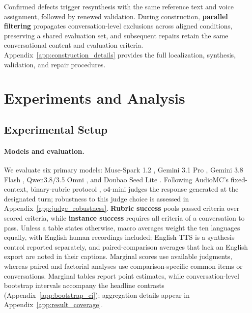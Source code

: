 \documentclass{article}
\begin{document}
    Confirmed defects trigger resynthesis with the same reference text and voice assignment, followed by renewed validation. During construction, \textbf{parallel filtering} propagates conversation-level exclusions across aligned conditions, preserving a shared evaluation set, and subsequent repairs retain the same conversational content and evaluation criteria. Appendix~\ref{app:construction_details} provides the full localization, synthesis, validation, and repair procedures.

\section{Experiments and Analysis}
\label{sec:experiments}

\subsection{Experimental Setup}
\label{sec:experimental_setup}

\paragraph{Models and evaluation.}
We evaluate six primary models: Muse-Spark 1.2 \citep{meta2026musespark12}, Gemini 3.1 Pro \citep{google2026gemini31pro}, Gemini 3.8 Flash \citep{google2026gemini38flash}, Qwen3.8/3.5 Omni \citep{qwenteam2026qwen38omni,qwenteam2026qwen35omni}, and Doubao Seed Lite \citep{bytedance2026doubaoseed20lite}. Following AudioMC's fixed-context, binary-rubric protocol \citep{gosai2026audiomultichallenge}, o4-mini \citep{openai2025o3o4mini} judges the response generated at the designated turn; robustness to this judge choice is assessed in Appendix~\ref{app:judge_robustness}. \textbf{Rubric success} pools passed criteria over scored criteria, while \textbf{instance success} requires all criteria of a conversation to pass. Unless a table states otherwise, macro averages weight the ten languages equally, with English human recordings included; English TTS is a synthesis control reported separately, and paired-comparison averages that lack an English export are noted in their captions. Marginal scores use available judgments, whereas paired and factorial analyses use comparison-specific common items or conversations. Marginal tables report point estimates, while conversation-level bootstrap intervals accompany the headline contrasts (Appendix~\ref{app:bootstrap_ci}); aggregation details appear in Appendix~\ref{app:result_coverage}.
\end{document}
